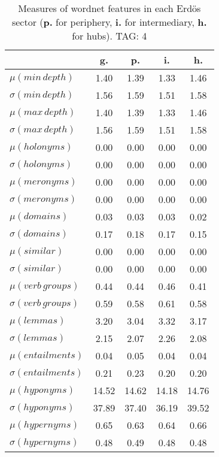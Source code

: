 \begin{table}[h!]
\begin{center}
\begin{tabular}{| l || c | c | c | c |}\hline
 & {\bf g.} & {\bf p.} & {\bf i.} & {\bf h.} \\\hline\hline
$\mu(min\,depth)$ & 1.40  & 1.39  & 1.33  & 1.46 \\
$\sigma(min\,depth)$ & 1.56  & 1.59  & 1.51  & 1.58 \\\hline
$\mu(max\,depth)$ & 1.40  & 1.39  & 1.33  & 1.46 \\
$\sigma(max\,depth)$ & 1.56  & 1.59  & 1.51  & 1.58 \\\hline
$\mu(holonyms)$ & 0.00  & 0.00  & 0.00  & 0.00 \\
$\sigma(holonyms)$ & 0.00  & 0.00  & 0.00  & 0.00 \\\hline
$\mu(meronyms)$ & 0.00  & 0.00  & 0.00  & 0.00 \\
$\sigma(meronyms)$ & 0.00  & 0.00  & 0.00  & 0.00 \\\hline
$\mu(domains)$ & 0.03  & 0.03  & 0.03  & 0.02 \\
$\sigma(domains)$ & 0.17  & 0.18  & 0.17  & 0.15 \\\hline
$\mu(similar)$ & 0.00  & 0.00  & 0.00  & 0.00 \\
$\sigma(similar)$ & 0.00  & 0.00  & 0.00  & 0.00 \\\hline
$\mu(verb\,groups)$ & 0.44  & 0.44  & 0.46  & 0.41 \\
$\sigma(verb\,groups)$ & 0.59  & 0.58  & 0.61  & 0.58 \\\hline
$\mu(lemmas)$ & 3.20  & 3.04  & 3.32  & 3.17 \\
$\sigma(lemmas)$ & 2.15  & 2.07  & 2.26  & 2.08 \\\hline
$\mu(entailments)$ & 0.04  & 0.05  & 0.04  & 0.04 \\
$\sigma(entailments)$ & 0.21  & 0.23  & 0.20  & 0.20 \\\hline
$\mu(hyponyms)$ & 14.52  & 14.62  & 14.18  & 14.76 \\
$\sigma(hyponyms)$ & 37.89  & 37.40  & 36.19  & 39.52 \\\hline
$\mu(hypernyms)$ & 0.65  & 0.63  & 0.64  & 0.66 \\
$\sigma(hypernyms)$ & 0.48  & 0.49  & 0.48  & 0.48 \\\hline
\end{tabular}
\caption{Measures of wordnet features in each Erd\"os sector ({{\bf p.}} for periphery, {{\bf i.}} for intermediary, {{\bf h.}} for hubs). TAG: 4}
\end{center}
\end{table}